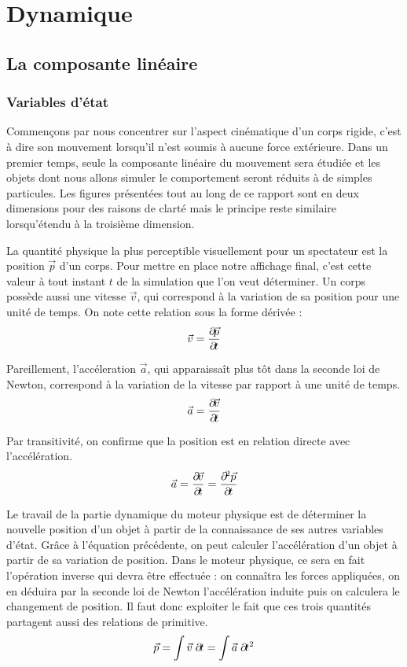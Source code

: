 \section{Dynamique} 

\subsection{La composante linéaire}

\subsubsection{Variables d'état}

Commençons par nous concentrer sur l'aspect cinématique d'un corps
rigide, c'est à dire son mouvement lorsqu'il n'est soumis à aucune
force extérieure. Dans un premier temps, seule la composante linéaire
du mouvement sera étudiée et les objets dont nous allons simuler le
comportement seront réduits à de simples particules. Les figures
présentées tout au long de ce rapport sont en deux dimensions pour des
raisons de clarté mais le principe reste similaire lorsqu'étendu à la
troisième dimension.

La quantité physique la plus perceptible visuellement pour un
spectateur est la position $\vec p$ d'un corps. Pour mettre en place
notre affichage final, c'est cette valeur à tout instant $t$ de la
simulation que l'on veut déterminer. Un corps possède aussi une
vitesse $\vec v$, qui correspond à la variation de sa position pour
une unité de temps. On note cette relation sous la forme dérivée :
\begin{align*}
  \vec{v} = \frac{\partial \! \vec{p}}{\partial \! t}
\end{align*}

Pareillement, l'accéleration $\vec a$, qui apparaissaît plus tôt dans
la seconde loi de Newton, correspond à la variation de la vitesse par
rapport à une unité de temps.
\begin{align*}
  \vec{a} = \frac{\partial \! \vec{v}}{\partial \! t}
\end{align*}

Par transitivité, on confirme que la position est en relation directe
avec l'accélération.
\begin{align*}
  \vec{a} = \frac{\partial \! \vec{v}}{\partial \! t} = \frac{\partial \!^2 \vec{p}}{\partial \! t}
\end{align*}

Le travail de la partie dynamique du moteur physique est de déterminer
la nouvelle position d'un objet à partir de la connaissance de ses
autres variables d'état. Grâce à l'équation précédente, on peut
calculer l'accélération d'un objet à partir de sa variation de
position. Dans le moteur physique, ce sera en fait l'opération inverse
qui devra être effectuée : on connaîtra les forces appliquées, on en
déduira par la seconde loi de Newton l'accélération induite puis on
calculera le changement de position. Il faut donc exploiter le fait
que ces trois quantités partagent aussi des relations de primitive.
\begin{align*}
  \vec{p} = \int \vec{v}\; \partial \! t = \int \vec{a}\; \partial \! t^2
\end{align*}

